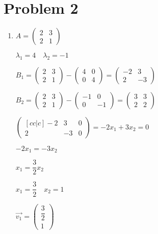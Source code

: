\documentclass[12pt,letterpaper]{article}
\begin{document}
\section*{Problem 2}
    \begin{enumerate}[label=(\alph*)]
        \item
        $A = \begin{pmatrix}
            2 & 3 \\
            2 & 1
        \end{pmatrix}$
        
        $\lambda_1 = 4\quad\lambda_2 = -1$
        
        $B_1 =  \begin{pmatrix} 2 & 3 \\ 2 & 1 \end{pmatrix} - 
                \begin{pmatrix} 4 & 0 \\ 0 & 4 \end{pmatrix} = 
                \begin{pmatrix} -2 & 3 \\ 2 & -3 \end{pmatrix}$
                
        $B_2 =  \begin{pmatrix} 2 & 3 \\ 2 & 1 \end{pmatrix} - 
                \begin{pmatrix} -1 & 0 \\ 0 & -1 \end{pmatrix} = 
                \begin{pmatrix} 3 & 3 \\ 2 & 2 \end{pmatrix}$       
                
        $\begin{pmatrix}[cc|c]
          -2 & 3 & 0\\
          2 & -3 & 0
        \end{pmatrix} = -2x_1 + 3x_2 = 0$
        
        $-2x_1 = -3x_2$
        
        $x_1 = \dfrac{3}{2}x_2$
        
        $x_1 = \dfrac{3}{2}\quad x_2 = 1$
        
        $\vec{v_1} = \begin{pmatrix} \dfrac{3}{2} \\ 1 \end{pmatrix}$
        

\end{enumerate}
\end{document}
